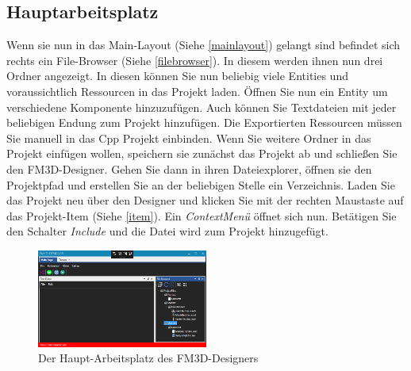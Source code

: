 \subsection{Hauptarbeitsplatz}
Wenn sie nun in das Main-Layout (Siehe \cref{mainlayout}) gelangt sind befindet sich rechts ein File-Browser (Siehe \cref{filebrowser}). In diesem werden ihnen nun drei Ordner angezeigt. In diesen können Sie nun beliebig viele Entities und voraussichtlich Ressourcen in das Projekt laden. Öffnen Sie nun ein Entity um verschiedene Komponente hinzuzufügen.
Auch können Sie Textdateien mit jeder beliebigen Endung zum Projekt hinzufügen.
Die Exportierten Ressourcen müssen Sie manuell in das Cpp Projekt einbinden.
Wenn Sie weitere Ordner in das Projekt einfügen wollen, speichern sie zunächst das Projekt ab und schließen Sie den FM3D-Designer. Gehen Sie dann in ihren Dateiexplorer, öffnen sie den Projektpfad und erstellen Sie an der beliebigen Stelle ein Verzeichnis. Laden Sie das Projekt neu über den Designer und klicken Sie mit der rechten Maustaste auf das Projekt-Item (Siehe \cref{item}). Ein \textit{ContextMenü} öffnet sich nun. Betätigen Sie den Schalter \textit{Include} und die Datei wird zum Projekt hinzugefügt.
\begin{figure}
	\begin{center}
		\includegraphics[width=0.5\textwidth]{04verwendung/Designer/01workstation.PNG}
		\caption{Der Haupt-Arbeitsplatz des FM3D-Designers}\label{arbeitsplatz}
	\end{center}
\end{figure}

